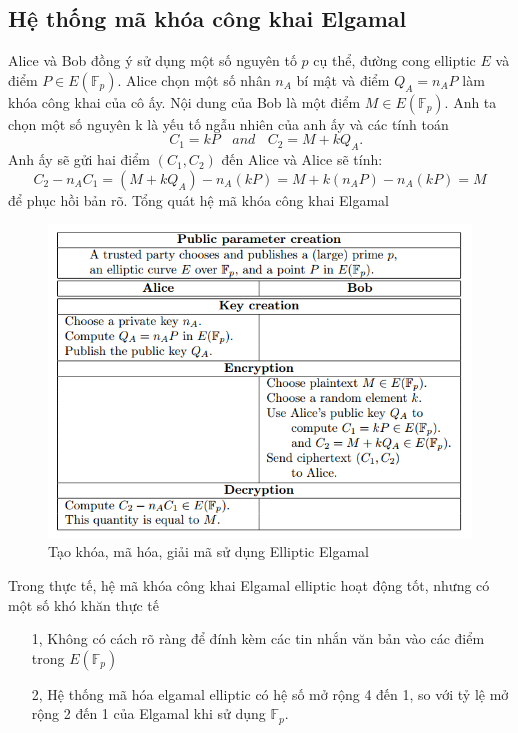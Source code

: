 \documentclass[a4paper,12pt]{report}
\begin{document}
\subsection*{Hệ thống mã khóa công khai Elgamal}
Alice và Bob đồng ý sử dụng một số nguyên tố $p$ cụ thể, đường cong elliptic $E$ và điểm $P \in E(\mathbb{F}_p)$. Alice chọn một số nhân $n_A$ bí mật và điểm $Q_A = n_AP$ làm khóa công khai của cô ấy. Nội dung của Bob là một điểm $M \in E(\mathbb{F}_p)$. Anh ta chọn một số nguyên k là yếu tố ngẫu nhiên của anh ấy và các tính toán
\begin{displaymath}
\ \ \ \ C_1 = kP \ \ \ \ and \ \ \ \ C_2 = M + kQ_A.
\end{displaymath}
Anh ấy sẽ gửi hai điểm $(C_1, C_2)$ đến Alice và Alice sẽ tính:
\begin{displaymath} 
C_2 - n_AC_1 = (M + kQ_A) - n_A(kP) = M + k(n_AP) - n_A(kP) = M
\end{displaymath}
để phục hồi bản rõ. Tổng quát hệ mã khóa công khai Elgamal \\
\begin{figure}[H]
\begin{center}
\includegraphics[scale=0.9]{../im5.png}
\caption{Tạo khóa, mã hóa, giải mã sử dụng Elliptic Elgamal}
\end{center}
\end{figure}
Trong thực tế, hệ mã khóa công khai Elgamal elliptic hoạt động tốt, nhưng có một số khó khăn thực tế
\begin{itemize}
\item[1, ] Không có cách rõ ràng để đính kèm các tin nhắn văn bản vào các điểm trong $E(\mathbb{F}_p)$
\item[2, ] Hệ thống mã hóa elgamal elliptic có hệ số mở rộng 4 đến 1, so với tỷ lệ mở rộng 2 đến 1 của Elgamal khi sử dụng $\mathbb{F}_p$.
\end{itemize}
\end{document}
